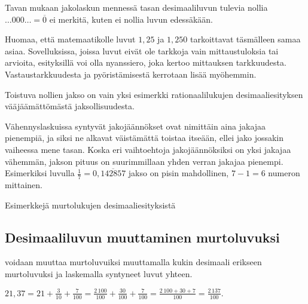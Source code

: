 Tavan mukaan jakolaskun mennessä tasan desimaaliluvun tulevia nollia $\ldots000\ldots=\overline{0}$ ei merkitä, kuten ei nollia luvun edessäkään.

\begin{esimerkki}
\end{esimerkki}

Huomaa, että matemaatikolle luvut $1,25$ ja $1,250$ tarkoittavat täsmälleen samaa asiaa. Sovelluksissa, joissa luvut eivät ole tarkkoja vain mittaustuloksia tai arvioita, esityksillä voi olla nyanssiero, joka kertoo mittauksen tarkkuudesta. Vastaustarkkuudesta ja pyöristämisestä kerrotaan lisää myöhemmin. %

Toistuva nollien jakso on vain yksi esimerkki rationaalilukujen desimaaliesityksen vääjäämättömästä jaksollisuudesta.


Vähennyslaskuissa syntyvät jakojäännökset ovat nimittäin aina jakajaa pienempiä, ja siksi ne alkavat väistämättä toistaa itseään, ellei jako jossakin vaiheessa mene tasan. Koska eri vaihtoehtoja jakojäännöksiksi on yksi jakajaa vähemmän, jakson pituus on suurimmillaan yhden verran jakajaa pienempi. Esimerkiksi luvulla $\frac{1}{7}=0,\overline{142857}$ jakso on pisin mahdollinen, $7-1=6$ numeron mittainen.

\begin{esimerkki}
Esimerkkejä murtolukujen desimaaliesityksistä
\end{esimerkki}


\subsection{Desimaaliluvun muuttaminen murtoluvuksi}

 voidaan muuttaa murtoluvuiksi muuttamalla kukin desimaali erikseen murtoluvuksi ja laskemalla syntyneet luvut yhteen.

\newpage %
\begin{esimerkki}
$21,37 = 21+ \frac{3}{10}+\frac{7}{100} =
\frac{2\,100}{100}+\frac{30}{100}+\frac{7}{100}
 = \frac{2\,100+30+7}{100} = \frac{2\,137}{100}.$
\end{esimerkki}

